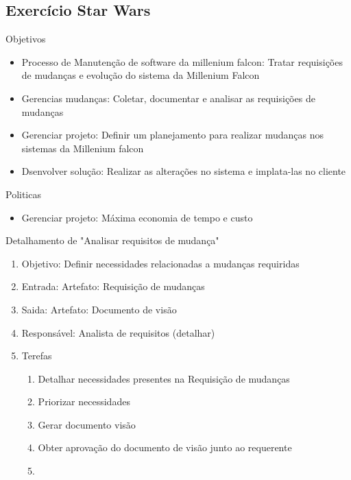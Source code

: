 \documentclass{article}
\begin{document}
\subsection{Exercício Star Wars}
	Objetivos\\
	
	\begin{itemize}
	\item Processo de Manutenção de software da millenium falcon: Tratar requisições de mudanças e evolução do sistema da Millenium Falcon
	\item Gerencias mudanças: Coletar, documentar e analisar as requisições de mudanças
	\item Gerenciar projeto: Definir um planejamento para realizar mudanças nos sistemas da Millenium falcon
	\item Dsenvolver solução: Realizar as alterações no sistema e implata-las no cliente
	\end{itemize}
	
	Politicas\\
	\begin{itemize}
	\item Gerenciar projeto: Máxima economia de tempo e custo
	\end{itemize}
		
	Detalhamento de "Analisar requisitos de mudança"
	\begin{enumerate}
	\item Objetivo: Definir necessidades relacionadas a mudanças requiridas
	\item Entrada: Artefato: Requisição de mudanças
	\item Saida: Artefato: Documento de visão
	\item Responsável: Analista de requisitos (detalhar)
	\item Terefas
		\begin{enumerate}
		\item Detalhar necessidades presentes na Requisição de mudanças
		\item Priorizar necessidades
		\item Gerar documento visão
		\item Obter aprovação do documento de visão junto ao requerente
		\item 
		\end{enumerate}
	\end{enumerate}			
		
\end{document}
